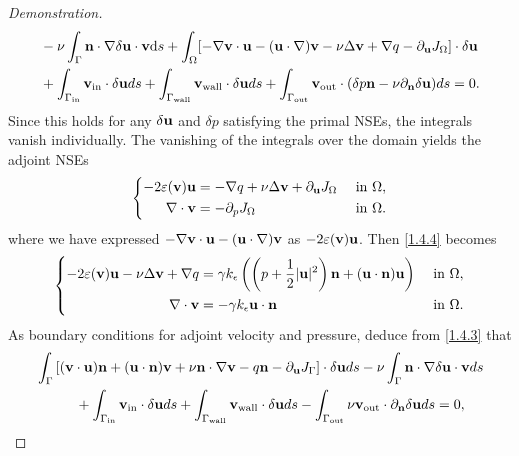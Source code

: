 \documentclass[oneside,11pt]{book}
\numberwithin{equation}{section}
\begin{document}
\begin{proof}[Demonstration]
\begin{align}
        &- \nu\int_\Gamma {\bf n}\cdot\nabla\delta{\bf u}\cdot{\bf v}{\rm d}s + \int_\Omega [-\nabla{\bf v}\cdot{\bf u} - ({\bf u}\cdot\nabla){\bf v} - \nu\Delta{\bf v} + \nabla q - \partial_{\bf u}J_\Omega]\cdot\delta{\bf u} \nonumber\\
        &+ \int_{\Gamma_{\rm in}} {\bf v}_{\rm in}\cdot\delta{\bf u}ds + \int_{\Gamma_{\rm wall}} {\bf v}_{\rm wall}\cdot\delta{\bf u}ds + \int_{\Gamma_{\rm out}} {\bf v}_{\rm out}\cdot(\delta p{\bf n} - \nu\partial_{\bf n}\delta{\bf u})ds = 0.\label{1.4.3}
    \end{align}
    Since this holds for any $\delta{\bf u}$ and $\delta p$ satisfying the primal NSEs, the integrals vanish individually. The vanishing of the integrals over the domain yields the adjoint NSEs
    \begin{equation}
        \label{1.4.4}
        \left\{\begin{split}
            -2\varepsilon({\bf v}){\bf u} &= -\nabla q + \nu\Delta{\bf v} + \partial_{\bf u}J_\Omega &&\mbox{ in } \Omega,\\
            \nabla\cdot{\bf v} &= -\partial_pJ_\Omega &&\mbox{ in } \Omega.
        \end{split}\right.    
    \end{equation}
    where we have expressed $-\nabla{\bf v}\cdot{\bf u} - ({\bf u}\cdot\nabla){\bf v}$ as $-2\varepsilon({\bf v}){\bf u}$. Then \eqref{1.4.4} becomes
    \begin{equation*}
        \left\{\begin{split}
            -2\varepsilon({\bf v}){\bf u} - \nu\Delta{\bf v} + \nabla q &= \gamma k_\epsilon\left(\left(p + \frac{1}{2}|{\bf u}|^2\right){\bf n} + ({\bf u}\cdot{\bf n}){\bf u}\right) &&\mbox{ in } \Omega,\\
            \nabla\cdot{\bf v} &= -\gamma k_\epsilon{\bf u}\cdot{\bf n} &&\mbox{ in } \Omega.
        \end{split}\right.    
    \end{equation*}
    As boundary conditions for adjoint velocity and pressure, deduce from \eqref{1.4.3} that
    \begin{align}
        &\int_\Gamma \left[({\bf v}\cdot{\bf u}){\bf n} + ({\bf u}\cdot{\bf n}){\bf v} + \nu{\bf n}\cdot\nabla{\bf v} - q{\bf n} - \partial_{\bf u}J_\Gamma\right]\cdot\delta{\bf u}ds - \nu\int_\Gamma {\bf n}\cdot\nabla\delta{\bf u}\cdot{\bf v}ds \nonumber\\
        &\hspace{1cm}+ \int_{\Gamma_{\rm in}} {\bf v}_{\rm in}\cdot\delta{\bf u}ds + \int_{\Gamma_{\rm wall}} {\bf v}_{\rm wall}\cdot\delta{\bf u}ds - \int_{\Gamma_{\rm out}} \nu{\bf v}_{\rm out}\cdot\partial_{\bf n}\delta{\bf u}ds = 0,\label{BC velocity}\\

\end{align}
\end{proof}
\end{document}
